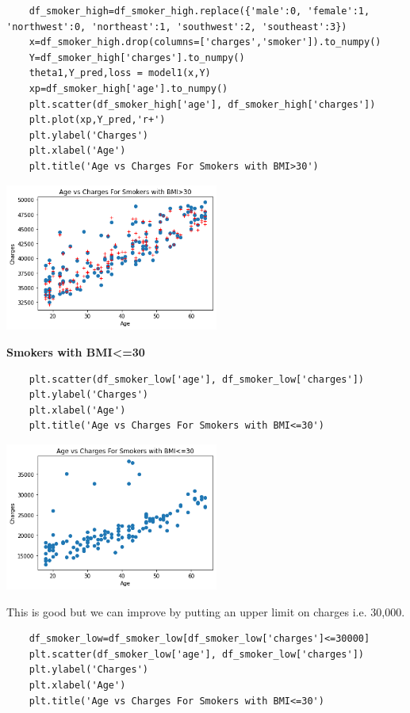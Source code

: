 \documentclass[12pt]{article}
\numberwithin{equation}{section}
\begin{document}
{\begin{lstlisting}
	df_smoker_high=df_smoker_high.replace({'male':0, 'female':1, 'northwest':0, 'northeast':1, 'southwest':2, 'southeast':3})
	x=df_smoker_high.drop(columns=['charges','smoker']).to_numpy()
	Y=df_smoker_high['charges'].to_numpy()
	theta1,Y_pred,loss = model1(x,Y)
	xp=df_smoker_high['age'].to_numpy()
	plt.scatter(df_smoker_high['age'], df_smoker_high['charges'])
	plt.plot(xp,Y_pred,'r+')
	plt.ylabel('Charges')
	plt.xlabel('Age')
	plt.title('Age vs Charges For Smokers with BMI>30')
\end{lstlisting}
\begin{center}
\includegraphics[width=7cm]{work10}\\
\end{center}
\textbf{\large{Smokers with BMI<=30}}
\begin{lstlisting}
	plt.scatter(df_smoker_low['age'], df_smoker_low['charges'])
	plt.ylabel('Charges')
	plt.xlabel('Age')
	plt.title('Age vs Charges For Smokers with BMI<=30')
\end{lstlisting}
\begin{center}
\includegraphics[width=7cm]{work11}\\
\end{center}
This is good but we can improve by putting an upper limit on charges i.e. 30,000.
\begin{lstlisting}
	df_smoker_low=df_smoker_low[df_smoker_low['charges']<=30000]
	plt.scatter(df_smoker_low['age'], df_smoker_low['charges'])
	plt.ylabel('Charges')
	plt.xlabel('Age')
	plt.title('Age vs Charges For Smokers with BMI<=30')

\end{lstlisting}}
\end{document}
